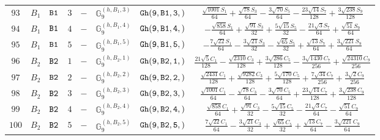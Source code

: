 \documentclass[fleqn,8pt]{jsarticle}
\begin{document}
\begin{table}[ht!]
\begin{center}
\begin{tabular}{cccccccc}
$ 93 $ & $ B_{1} $ & $ {\tt B1} $ & $ 3 $ & $ - $ & $ \mathbb{G}_{9}^{(h,B_{1},3)} $ & $ {\tt Gh(9,B1,3,)} $ & $ \frac{\sqrt{1001} S_{1}}{64} + \frac{\sqrt{78} S_{3}}{64} - \frac{3 \sqrt{70} S_{5}}{64} - \frac{23 \sqrt{14} S_{7}}{128} + \frac{3 \sqrt{238} S_{9}}{128} $ \\
$ 94 $ & $ B_{1} $ & $ {\tt B1} $ & $ 4 $ & $ - $ & $ \mathbb{G}_{9}^{(h,B_{1},4)} $ & $ {\tt Gh(9,B1,4,)} $ & $ - \frac{\sqrt{858} S_{1}}{64} + \frac{\sqrt{91} S_{3}}{32} + \frac{5 \sqrt{15} S_{5}}{32} - \frac{21 \sqrt{3} S_{7}}{64} + \frac{\sqrt{51} S_{9}}{64} $ \\
$ 95 $ & $ B_{1} $ & $ {\tt B1} $ & $ 5 $ & $ - $ & $ \mathbb{G}_{9}^{(h,B_{1},5)} $ & $ {\tt Gh(9,B1,5,)} $ & $ - \frac{7 \sqrt{22} S_{1}}{64} - \frac{3 \sqrt{21} S_{3}}{32} - \frac{\sqrt{65} S_{5}}{32} + \frac{\sqrt{13} S_{7}}{64} + \frac{3 \sqrt{221} S_{9}}{64} $ \\
$ 96 $ & $ B_{2} $ & $ {\tt B2} $ & $ 1 $ & $ - $ & $ \mathbb{G}_{9}^{(h,B_{2},1)} $ & $ {\tt Gh(9,B2,1,)} $ & $ \frac{21 \sqrt{5} C_{1}}{128} - \frac{\sqrt{2310} C_{3}}{128} + \frac{3 \sqrt{286} C_{5}}{128} - \frac{3 \sqrt{1430} C_{7}}{256} + \frac{\sqrt{24310} C_{9}}{256} $ \\
$ 97 $ & $ B_{2} $ & $ {\tt B2} $ & $ 2 $ & $ - $ & $ \mathbb{G}_{9}^{(h,B_{2},2)} $ & $ {\tt Gh(9,B2,2,)} $ & $ \frac{\sqrt{2431} C_{1}}{128} + \frac{\sqrt{9282} C_{3}}{128} + \frac{5 \sqrt{170} C_{5}}{128} + \frac{7 \sqrt{34} C_{7}}{256} + \frac{3 \sqrt{2} C_{9}}{256} $ \\
$ 98 $ & $ B_{2} $ & $ {\tt B2} $ & $ 3 $ & $ - $ & $ \mathbb{G}_{9}^{(h,B_{2},3)} $ & $ {\tt Gh(9,B2,3,)} $ & $ \frac{\sqrt{1001} C_{1}}{64} - \frac{\sqrt{78} C_{3}}{64} - \frac{3 \sqrt{70} C_{5}}{64} + \frac{23 \sqrt{14} C_{7}}{128} + \frac{3 \sqrt{238} C_{9}}{128} $ \\
$ 99 $ & $ B_{2} $ & $ {\tt B2} $ & $ 4 $ & $ - $ & $ \mathbb{G}_{9}^{(h,B_{2},4)} $ & $ {\tt Gh(9,B2,4,)} $ & $ \frac{\sqrt{858} C_{1}}{64} + \frac{\sqrt{91} C_{3}}{32} - \frac{5 \sqrt{15} C_{5}}{32} - \frac{21 \sqrt{3} C_{7}}{64} - \frac{\sqrt{51} C_{9}}{64} $ \\
$ 100 $ & $ B_{2} $ & $ {\tt B2} $ & $ 5 $ & $ - $ & $ \mathbb{G}_{9}^{(h,B_{2},5)} $ & $ {\tt Gh(9,B2,5,)} $ & $ \frac{7 \sqrt{22} C_{1}}{64} - \frac{3 \sqrt{21} C_{3}}{32} + \frac{\sqrt{65} C_{5}}{32} + \frac{\sqrt{13} C_{7}}{64} - \frac{3 \sqrt{221} C_{9}}{64} $ \\
 \hline \hline
\end{tabular}
\end{center}
\end{table}
\end{document}

